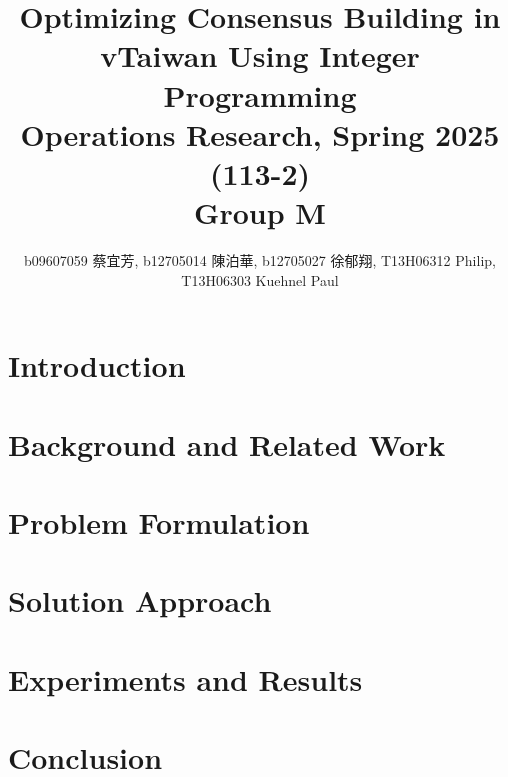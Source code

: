 \documentclass[10pt]{article}
\title{Optimizing Consensus Building in vTaiwan Using Integer Programming \\
\large Operations Research, Spring 2025 (113-2) \\ Group M}
\author{b09607059 蔡宜芳, b12705014 陳泊華,
    b12705027 徐郁翔, T13H06312 Philip, T13H06303 Kuehnel Paul}
\affil{Department of Information Management, National Taiwan University}
\begin{document}
\maketitle


\section{Introduction}\label{sec:intro}


\section{Background and Related Work}\label{sec:background}


\section{Problem Formulation}\label{sec:problem_formulation}


%

\section{Solution Approach}\label{sec:solution}


\section{Experiments and Results}\label{sec:experiments}


%

\section{Conclusion}\label{sec:conclusion}


\printbibliography
\end{document}
